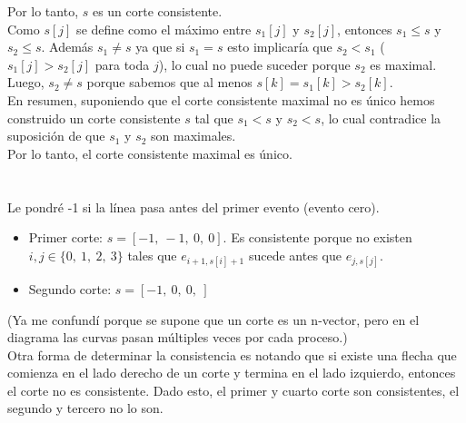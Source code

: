 \documentclass{article}
\begin{document}
\begin{itemize}
\begin{enumerate}
    \end{enumerate}
    Por lo tanto, $s$ es un corte consistente. \\
    Como $s[j]$ se define como el máximo entre $s_1[j]$ y $s_2[j]$, entonces $s_1 \leq s$ y $s_2 \leq s$. Además $s_1 \not= s$ ya que si $s_1 = s$ esto implicaría que $s_2 < s_1$ ($s_1[j] > s_2[j]$ para toda $j$), lo cual no puede suceder porque $s_2$ es maximal. Luego, $s_2 \not= s$ porque sabemos que al menos $s[k] = s_1[k] > s_2[k]$. \\
    En resumen, suponiendo que el corte consistente maximal no es único hemos construido un corte consistente $s$ tal que $s_1 < s$ y $s_2 < s$, lo cual contradice la suposición de que $s_1$ y $s_2$ son maximales. \\
    Por lo tanto, el corte consistente maximal es único.
    
\end{itemize}

\section{}

Le pondré -1 si la línea pasa antes del primer evento (evento cero).

\begin{itemize}
    \item Primer corte: $s = [-1,\ -1,\ 0,\ 0]$. Es consistente porque no existen $i,j \in \{0,\ 1,\ 2,\ 3\}$ tales que $e_{i + 1, s[i] + 1}$ sucede antes que $e_{j, s[j]}$.
    \item Segundo corte: $s = [-1,\ 0,\ 0,\ ]$
\end{itemize}

(Ya me confundí porque se supone que un corte es un n-vector, pero en el diagrama las curvas pasan múltiples veces por cada proceso.) \\

Otra forma de determinar la consistencia es notando que si existe una flecha que comienza en el lado derecho de un corte y termina en el lado izquierdo, entonces el corte no es consistente. Dado esto, el primer y cuarto corte son consistentes, el segundo y tercero no lo son.

\section{}
\end{document}
